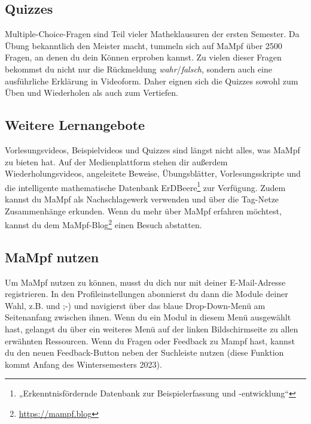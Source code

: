 \subsection{Quizzes}
Multiple-Choice-Fragen sind Teil vieler Matheklausuren der ersten Semester. Da Übung bekanntlich den Meister macht, tummeln sich auf MaMpf über 2500 Fragen, an denen du dein Können erproben kannst. Zu vielen dieser Fragen bekommst du nicht nur die Rückmeldung \emph{wahr}/\emph{falsch}, sondern auch eine ausführliche Erklärung in Videoform. Daher eignen sich die Quizzes sowohl zum Üben und Wiederholen als auch zum Vertiefen.

\subsection{Weitere Lernangebote}
Vorlesungsvideos, Beispielvideos und Quizzes sind längst nicht alles, was MaMpf zu bieten hat.
Auf der Medienplattform stehen dir außerdem Wiederholungsvideos, angeleitete Beweise, Übungsblätter, Vorlesungsskripte und die intelligente mathematische Datenbank ErDBeere\footnote{„Erkenntnisfördernde Datenbank zur Beispielerfassung und -entwicklung“} zur Verfügung. Zudem kannst du MaMpf als Nachschlagewerk verwenden und über die Tag-Netze Zusammenhänge erkunden. Wenn du mehr über MaMpf erfahren möchtest, kannst du dem MaMpf-Blog\footnote{\url{https://mampf.blog}} einen Besuch abstatten.  

\subsection{MaMpf nutzen}
Um MaMpf nutzen zu können, musst du dich nur mit deiner E-Mail-Adresse registrieren. In den Profileinstellungen abonnierst du dann die Module deiner Wahl, z.B.  und  ;-) und navigierst über das blaue Drop-Down-Menü am Seitenanfang zwischen ihnen. Wenn du ein Modul in diesem Menü ausgewählt hast, gelangst du über ein weiteres Menü auf der linken Bildschirmseite zu allen erwähnten Ressourcen. Wenn du Fragen oder Feedback zu Mampf hast, kannst du den neuen Feedback-Button neben der Suchleiste nutzen (diese Funktion kommt Anfang des Wintersemesters 2023).
